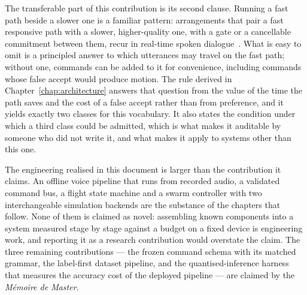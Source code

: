 The transferable part of this contribution is its second clause. Running a fast path beside a
slower one is a familiar pattern: arrangements that pair a fast responsive path with a slower,
higher-quality one, with a gate or a cancellable commitment between them, recur in real-time spoken
dialogue~\cite{relays2s,mira}. What is easy to omit is a principled answer to which utterances may
travel on the fast path; without one, commands can be added to it for convenience, including
commands whose false accept would produce motion. The rule derived in
Chapter~\ref{chap:architecture} answers that question from the value of the time the path saves
and the cost of a false accept rather than from preference, and it yields exactly two classes for
this vocabulary. It also states the condition under which a third class could be admitted, which
is what makes it auditable by someone who did not write it, and what makes it apply to systems
other than this one.

The engineering realised in this document is larger than the contribution it claims. An offline
voice pipeline that runs from recorded audio, a validated command bus, a flight state machine and a
swarm controller with two interchangeable simulation backends are the substance of the chapters
that follow. None of them is claimed as novel: assembling known components into a system measured
stage by stage against a budget on a fixed device is engineering work, and reporting it as a
research contribution would overstate the claim. The three remaining contributions --- the frozen
command schema with its matched grammar, the label-first dataset pipeline, and the
quantised-inference harness that measures the accuracy cost of the deployed pipeline --- are
claimed by the \emph{M\'emoire de Master}.

